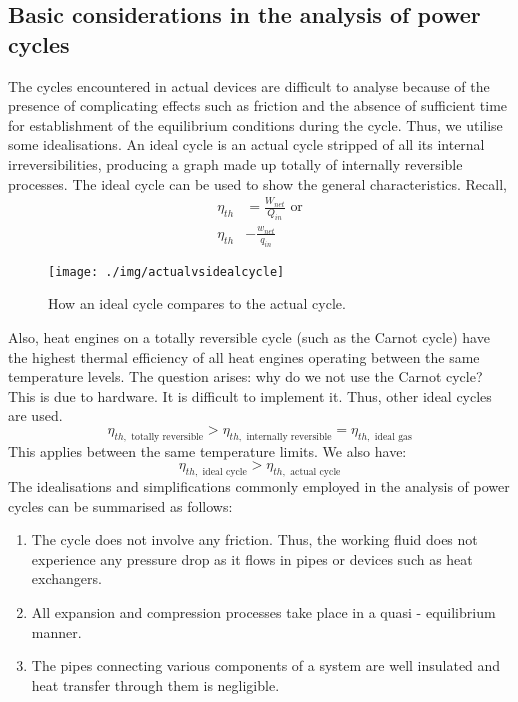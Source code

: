 \subsection{Basic considerations in the analysis of power cycles}
The cycles encountered in actual devices are difficult to analyse because of the presence of complicating effects such as friction and the absence of sufficient time for establishment of the equilibrium conditions during the cycle. Thus, we utilise some idealisations. An ideal cycle is an actual cycle stripped of all its internal irreversibilities, producing a graph made up totally of internally reversible processes. The ideal cycle can be used to show the general characteristics. Recall,
\begin{align}
  \eta_{th} & = \frac{W_{net}}{Q_{in}} \textrm{ or} \\
  \eta_{th} & - \frac{w_{net}}{q_{in}}
\end{align}
\begin{figure}[h]
  \centering
  \texttt{[image: ./img/actualvsidealcycle]}
  \caption{How an ideal cycle compares to the actual cycle.}
  \label{fig:actualvsidealcycle}
\end{figure}
Also, heat engines on a totally reversible cycle (such as the Carnot cycle) have the highest thermal efficiency of all heat engines operating between the same temperature levels. The question arises: why do we not use the Carnot cycle? This is due to hardware. It is difficult to implement it. Thus, other ideal cycles are used.
\begin{equation}
  \eta_{th, \textrm{ totally reversible}} > \eta_{th, \textrm{ internally reversible}} = \eta_{th, \textrm{ ideal gas}}
\end{equation}
This applies between the same temperature limits. We also have:
\begin{equation}
  \eta_{th, \textrm{ ideal cycle}} > \eta_{th, \textrm{ actual cycle}}
\end{equation}
The idealisations and simplifications commonly employed in the analysis of power cycles can be summarised as follows:
\begin{enumerate}[noitemsep]
  \item The cycle does not involve any friction. Thus, the working fluid does not experience any pressure drop as it flows in pipes or devices such as heat exchangers.
  \item All expansion and compression processes take place in a quasi - equilibrium manner.
  \item The pipes connecting various components of a system are well insulated and heat transfer through them is negligible.
\end{enumerate}
